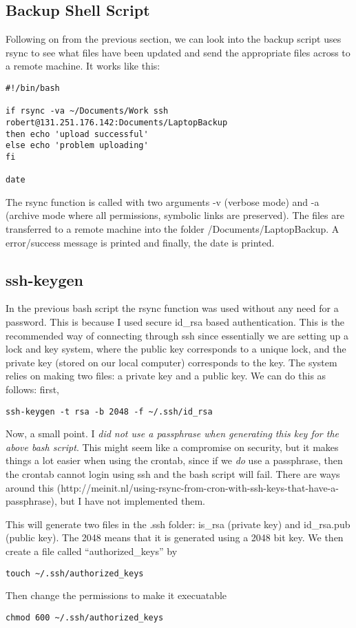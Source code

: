 \documentclass[a4paper, 10pt]{article}
\begin{document}
\subsection*{Backup Shell Script}

Following on from the previous section, we can look into the backup script uses rsync to see what files have been updated and send the appropriate files across to a remote machine. It works like this:
\begin{Verbatim}
#!/bin/bash

if rsync -va ~/Documents/Work ssh robert@131.251.176.142:Documents/LaptopBackup
then echo 'upload successful'
else echo 'problem uploading'
fi

date
\end{Verbatim}
The rsync function is called with two arguments -v (verbose mode) and -a (archive mode where all permissions, symbolic links are preserved). The files are transferred to a remote machine into the folder /Documents/LaptopBackup. A error/success message is printed and finally, the date is printed. 


\subsection*{ssh-keygen}

In the previous bash script the rsync function was used without any
need for a password. This is because I used secure id\_rsa based
authentication. This is the recommended way of connecting through ssh
since essentially we are setting up a lock and key system, where the
public key corresponds to a unique lock, and the private key (stored
on our local computer) corresponds to the key. The system relies on making two files:  a private key and a public key. We can do this as follows: first, 
\begin{verbatim}
ssh-keygen -t rsa -b 2048 -f ~/.ssh/id_rsa
\end{verbatim}
Now, a small point. I \emph{did not use a passphrase when generating this key for the above bash script}. This might seem like a compromise on security, but it makes things a lot easier when using the crontab, since if we \emph{do} use a passphrase, then the crontab cannot login using ssh and the bash script will fail. There are ways around this (http://meinit.nl/using-rsync-from-cron-with-ssh-keys-that-have-a-passphrase), but I have not implemented them.

This will generate two files in the .ssh folder: is\_rsa (private key) and id\_rsa.pub (public key). The 2048 means that it is generated using a 2048 bit key. We then create a file called ``authorized\_keys'' by 
\begin{verbatim}
touch ~/.ssh/authorized_keys
\end{verbatim}
Then change the permissions to make it execuatable
\begin{verbatim}
chmod 600 ~/.ssh/authorized_keys
\end{verbatim}
\end{document}
